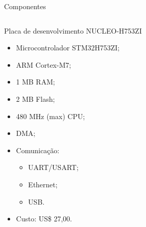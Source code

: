 \documentclass{if-beamer}
\begin{document}
\begin{frame}{Componentes}
	
		\begin{columns}
		
		\begin{column}{0.6\textwidth}
			
	\begin{block}{Placa de desenvolvimento NUCLEO-H753ZI}
	
	\begin{itemize}
		\item Microcontrolador STM32H753ZI;
		\item ARM Cortex-M7;
		\item 1 MB RAM;
		\item 2 MB Flash;
		\item 480 MHz (max) CPU;
		\item DMA;
		\item Comunicação:
		\begin{itemize}
			\item UART/USART;
			\item Ethernet;
			\item USB.
		\end{itemize}
		\item Custo: US\$ 27,00.
	\end{itemize}
	
\end{block}
			
		\end{column}
		
		\begin{column}{0.4\textwidth}
			

\end{column}
\end{columns}
\end{frame}
\end{document}

